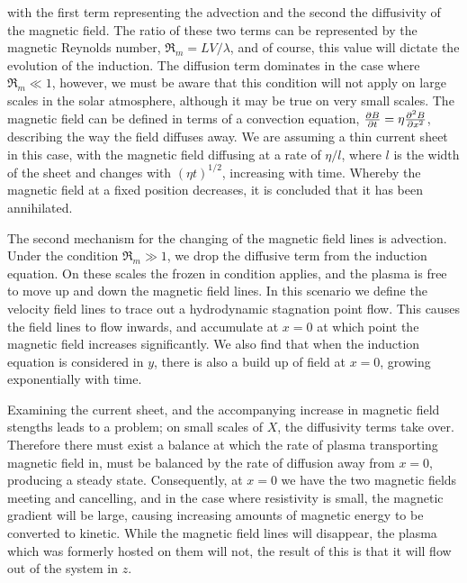 \noindent with the first term representing the advection and the second the diffusivity of the magnetic field.
The ratio of these two terms can be represented by the magnetic Reynolds number, $\Re_m = LV/\lambda$, and of course, this value will dictate the evolution of the induction.
The diffusion term dominates in the case where $\Re_m \ll 1$, however, we must be aware that this condition will not apply on large scales in the solar atmosphere, although it may be true on very small scales.
The magnetic field can be defined in terms of a convection equation, $\frac{\partial B}{\partial t } = \eta\frac{\partial^2B}{\partial x^2}$, describing the way the field diffuses away.
We are assuming a thin current sheet in this case, with the magnetic field diffusing at a rate of $\eta/l$, where $l$ is the width of the sheet and changes with $(\eta t)^{1/2}$, increasing with time.
Whereby the magnetic field at a fixed position decreases, it is concluded that it has been annihilated.

The second mechanism for the changing of the magnetic field lines is advection. 
Under the condition $\Re_m \gg 1$, we drop the diffusive term from the induction equation.
On these scales the frozen in condition applies, and the plasma is free to move up and down the magnetic field lines.
In this scenario we define the velocity field lines to trace out a hydrodynamic stagnation point flow.
This causes the field lines to flow inwards, and accumulate at $x = 0$ at which point the magnetic field increases significantly.
We also find that when the induction equation is considered in $y$, there is also a build up of field at $x = 0$, growing exponentially with time.

Examining the current sheet, and the accompanying increase in magnetic field stengths leads to a problem; on small scales of $X$, the diffusivity terms take over.
Therefore there must exist a balance at which the rate of plasma transporting magnetic field in, must be balanced by the rate of diffusion away from $x = 0$, producing a steady state.
Consequently, at $x = 0$ we have the two magnetic fields meeting and cancelling, and in the case where resistivity is small, the magnetic gradient will be large, causing increasing amounts of magnetic energy to be converted to kinetic.
While the magnetic field lines will disappear, the plasma which was formerly hosted on them will not, the result of this is that it will flow out of the system in $z$.

